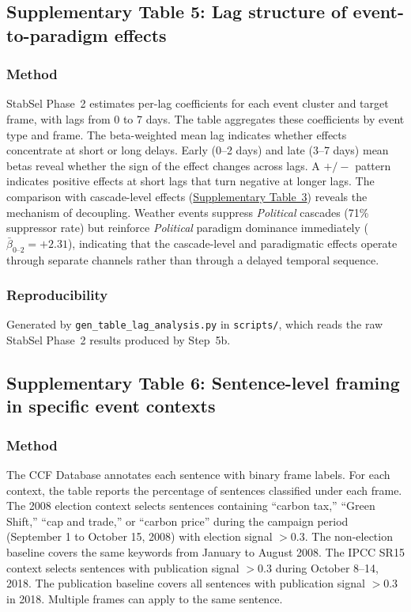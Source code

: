 \documentclass[11pt]{article}
\begin{document}

\newpage
\subsection*{Supplementary Table 5: Lag structure of event-to-paradigm effects}



\subsubsection*{Method}
StabSel Phase~2 estimates per-lag coefficients for each event cluster and target frame, with lags from 0 to 7 days. The table aggregates these coefficients by event type and frame. The beta-weighted mean lag indicates whether effects concentrate at short or long delays. Early (0--2 days) and late (3--7 days) mean betas reveal whether the sign of the effect changes across lags. A $+/-$ pattern indicates positive effects at short lags that turn negative at longer lags. The comparison with cascade-level effects (\hyperref[tab:si_event_frame]{Supplementary Table~3}) reveals the mechanism of decoupling. Weather events suppress \emph{Political} cascades (71\% suppressor rate) but reinforce \emph{Political} paradigm dominance immediately ($\bar{\beta}_{0\text{--}2} = +2.31$), indicating that the cascade-level and paradigmatic effects operate through separate channels rather than through a delayed temporal sequence.

\subsubsection*{Reproducibility}
Generated by \texttt{gen\_table\_lag\_analysis.py} in \texttt{scripts/},
which reads the raw StabSel Phase~2 results produced by Step~5b.


\newpage
\subsection*{Supplementary Table 6: Sentence-level framing in specific event contexts}



\subsubsection*{Method}
The CCF Database annotates each sentence with binary frame labels. For each context, the table reports the percentage of sentences classified under each frame. The 2008 election context selects sentences containing ``carbon tax,'' ``Green Shift,'' ``cap and trade,'' or ``carbon price'' during the campaign period (September 1 to October 15, 2008) with election signal $> 0.3$. The non-election baseline covers the same keywords from January to August 2008. The IPCC SR15 context selects sentences with publication signal $> 0.3$ during October 8--14, 2018. The publication baseline covers all sentences with publication signal $> 0.3$ in 2018. Multiple frames can apply to the same sentence.
\end{document}
